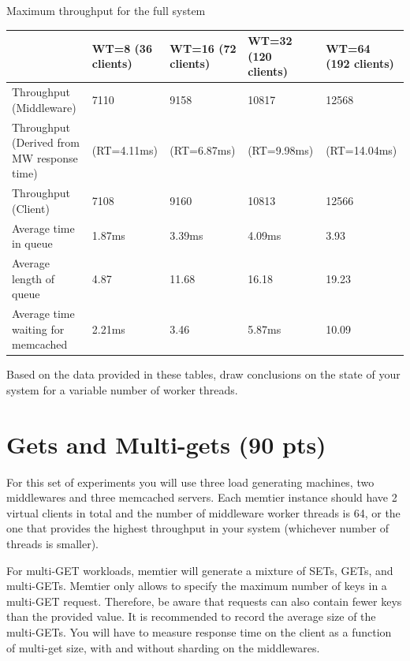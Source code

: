 \documentclass[11pt,a4paper]{article}
\begin{document}
\begin{center}
	{Maximum throughput for the full system}
	\begin{tabular}{|l|p{1.5cm}|p{1.5cm}|p{1.5cm}|p{1.5cm}|}
		\hline                                            & WT=8 (36 clients) & WT=16 (72 clients)  & WT=32 (120 clients)   & WT=64 (192 clients)   \\ 
		\hline Throughput (Middleware)                    & 7110              & 9158                & 10817                 & 12568                 \\ 
		\hline Throughput (Derived from MW response time) & (RT=4.11ms)       & (RT=6.87ms)         & (RT=9.98ms)           & (RT=14.04ms)         \\ 
		\hline Throughput (Client)                        & 7108              & 9160                & 10813                 & 12566                 \\ 
		\hline Average time in queue                      & 1.87ms            & 3.39ms              & 4.09ms                & 3.93                  \\ 
		\hline Average length of queue                    & 4.87              & 11.68               & 16.18                 & 19.23                 \\ 
		\hline Average time waiting for memcached         & 2.21ms            & 3.46                & 5.87ms                & 10.09                 \\ 
		\hline 
	\end{tabular}
\end{center}

Based on the data provided in these tables, draw conclusions on the state of your system for a variable number of worker threads.

\section{Gets and Multi-gets (90 pts)}

For this set of experiments you will use three load generating machines, two middlewares and three memcached servers. Each memtier instance should have 2 virtual clients in total and the number of middleware worker threads is 64, or the one that provides the highest throughput in your system (whichever number of threads is smaller).

For multi-GET workloads, memtier will generate a mixture of SETs, GETs, and multi-GETs. Memtier only allows to specify the maximum number of keys in a multi-GET request. Therefore, be aware that requests can also contain fewer keys than the provided value. It is recommended to record the average size of the multi-GETs. You will have to measure response time on the client as a function of multi-get size, with and without sharding on the middlewares.
\end{document}
